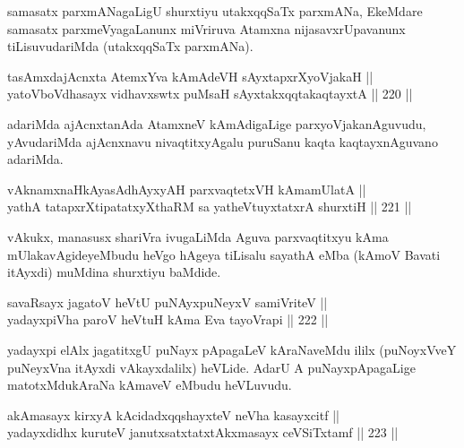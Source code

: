 \begin{artha}
samasatx parxmANagaLigU shurxtiyu utakxqqSaTx parxmANa, EkeMdare
samasatx parxmeVyagaLanunx miVriruva Atamxna nijasavxrUpavanunx
tiLisuvudariMda (utakxqqSaTx parxmANa).
\end{artha}

\begin{shl}
tasAmxdajAcnxta AtemxYva kAmAdeVH sAyxtapxrXyoVjakaH || \\
yatoV\s boVdhasayx vidhavxswtx puMsaH sAyxtakxqqtakaqtayxtA \hfill || 220 ||  
\end{shl}

\begin{artha}
adariMda ajAcnxtanAda AtamxneV kAmAdigaLige parxyoVjakanAguvudu,
yAvudariMda ajAcnxnavu nivaqtitxyAgalu puruSanu kaqta kaqtayxnAguvano
adariMda.
\end{artha}


\begin{shl}
vAknamxnaHkAyasAdhAyxyAH parxvaqtetxVH kAmamUlatA || \\
yathA tatapxrXtipatatxyXthaRM sa yatheVtuyxtatxrA shurxtiH \hfill || 221 ||  
\end{shl}

\begin{artha}
vAkukx, manasusx shariVra ivugaLiMda Aguva parxvaqtitxyu kAma
mUlakavAgideyeMbudu heVgo hAgeya tiLisalu sayathA eMba (kAmoV Bavati
itAyxdi) muMdina shurxtiyu baMdide.
\end{artha}

\begin{shl}
savaRsayx jagatoV heVtU puNAyxpuNeyxV samiVriteV || \\
yadayxpiVha paroV heVtuH kAma Eva tayoVrapi \hfill || 222 ||  
\end{shl}

\begin{artha}
yadayxpi elAlx jagatitxgU puNayx pApagaLeV kAraNaveMdu ililx
(puNoyxVveY puNeyxVna itAyxdi vAkayxdalilx) heVLide. AdarU A
puNayxpApagaLige matotxMdukAraNa kAmaveV eMbudu heVLuvudu.
\end{artha}

\begin{shl}
akAmasayx kirxyA kAcidadxqqshayxteV neVha kasayxcitf || \\
yadayxdidhx kuruteV janutxsatxtatxtAkxmasayx ceVSiTxtamf \hfill || 223 ||  
\end{shl}

